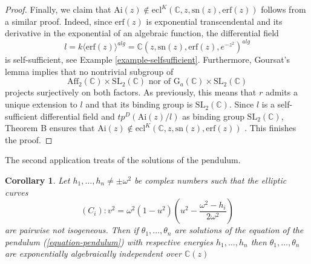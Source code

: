 \documentclass[12pt]{amsart}
\theoremstyle{definition}
\theoremstyle{plain}
\newtheorem{cor}[defn]{Corollary}
\theoremstyle{exampstyle}\newtheorem{thmx}{Theorem}
\theoremstyle{exampstyle}\newtheorem{thmxbis}{Theorem}
\newcommand{\Ga}{\mathrm{G}_a}
\begin{document}
\begin{proof}
Finally, we claim that  $\mathrm{Ai}(z) \notin  \mathrm{ecl}^K(\mathbb{C},z, \mathrm{sn}(z), \mathrm{erf}(z))$ follows from a similar proof. Indeed, since $\mathrm{erf}(z)$ is exponential transcendental and its derivative in the exponential of an algebraic function, the differential field $$l = k \langle \mathrm{erf}(z) \rangle^{alg} = \mathbb{C}(z,\mathrm{sn}(z),\mathrm{erf}(z), e^{-z^2})^{alg}$$ is self-sufficient, see Example \ref{example-selfsufficient}. Furthermore, Goursat's lemma implies that no nontrivial subgroup of $$ \mathrm{Aff}_2(\mathbb{C}) \times \mathrm{SL}_2(\mathbb{C}) \text{ nor of } \Ga(\mathbb{C}) \times \mathrm{SL}_2(\mathbb{C}) $$
projects surjectively on both factors. As previously, this means that $r$ admits a unique extension to $l$ and that its binding group is $\mathrm{SL}_2(\mathbb{C})$.  Since $l$ is a self-sufficient differential field and $tp^{D}(\mathrm{Ai}(z)/l)$ as binding group $\mathrm{SL}_2(\mathbb{C})$, Theorem B ensures that $\mathrm{Ai}(z) \notin  \mathrm{ecl}^K(\mathbb{C},z, \mathrm{sn}(z), \mathrm{erf}(z))$ . This finishes the proof. 
\end{proof} 

The second application treats of the solutions of the pendulum.

\begin{cor} \label{cor-pendulum-ind}
Let $h_1,\ldots, h_n \neq \pm \omega^2$ be complex numbers such that the elliptic curves 
$$ (C_i): v^2 = \omega^2(1-u^2)(u^2 - \frac{\omega^2-h_i}{2\omega^2}) $$
are pairwise not isogeneous. Then if $\theta_1,\ldots, \theta_n$ are solutions of the equation of the pendulum (\ref{equation-pendulum}) with respective energies  $h_1,\ldots, h_n$ then $\theta_1,\ldots, \theta_n$ are {\em exponentially algebraically independent} over $\mathbb{C}(z)$
\end{cor} 
\end{document}
